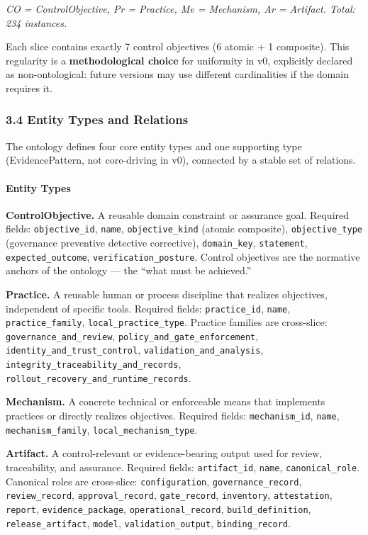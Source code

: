\documentclass[
]{article}
\begin{document}
\emph{CO = ControlObjective, Pr = Practice, Me = Mechanism, Ar =
Artifact. Total: 234 instances.}

Each slice contains exactly 7 control objectives (6 atomic + 1
composite). This regularity is a \textbf{methodological choice} for
uniformity in v0, explicitly declared as non-ontological: future
versions may use different cardinalities if the domain requires it.

\subsubsection{3.4 Entity Types and
Relations}\label{entity-types-and-relations}

The ontology defines four core entity types and one supporting type
(EvidencePattern, not core-driving in v0), connected by a stable set of
relations.

\paragraph{Entity Types}\label{entity-types}

\textbf{ControlObjective.} A reusable domain constraint or assurance
goal. Required fields: \texttt{objective\_id}, \texttt{name},
\texttt{objective\_kind} (atomic \textbar{} composite),
\texttt{objective\_type} (governance \textbar{} preventive \textbar{}
detective \textbar{} corrective), \texttt{domain\_key},
\texttt{statement}, \texttt{expected\_outcome},
\texttt{verification\_posture}. Control objectives are the normative
anchors of the ontology --- the ``what must be achieved.''

\textbf{Practice.} A reusable human or process discipline that realizes
objectives, independent of specific tools. Required fields:
\texttt{practice\_id}, \texttt{name}, \texttt{practice\_family},
\texttt{local\_practice\_type}. Practice families are cross-slice:
\texttt{governance\_and\_review},
\texttt{policy\_and\_gate\_enforcement},
\texttt{identity\_and\_trust\_control},
\texttt{validation\_and\_analysis},
\texttt{integrity\_traceability\_and\_records},
\texttt{rollout\_recovery\_and\_runtime\_records}.

\textbf{Mechanism.} A concrete technical or enforceable means that
implements practices or directly realizes objectives. Required fields:
\texttt{mechanism\_id}, \texttt{name}, \texttt{mechanism\_family},
\texttt{local\_mechanism\_type}.

\textbf{Artifact.} A control-relevant or evidence-bearing output used
for review, traceability, and assurance. Required fields:
\texttt{artifact\_id}, \texttt{name}, \texttt{canonical\_role}.
Canonical roles are cross-slice: \texttt{configuration},
\texttt{governance\_record}, \texttt{review\_record},
\texttt{approval\_record}, \texttt{gate\_record}, \texttt{inventory},
\texttt{attestation}, \texttt{report}, \texttt{evidence\_package},
\texttt{operational\_record}, \texttt{build\_definition},
\texttt{release\_artifact}, \texttt{model}, \texttt{validation\_output},
\texttt{binding\_record}.
\end{document}
